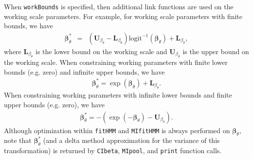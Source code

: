 \documentclass[12pt]{article}\usepackage[]{graphicx}\usepackage[]{color}
\begin{document}
When \verb|workBounds| is specified, then additional link functions are used on the working scale parameters.  For example, for working scale parameters with finite bounds, we have
\begin{eqnarray*}
{\boldsymbol \beta}_\theta^* &=&  \left({\mathbf U}_{\beta_\theta} - {\mathbf L}_{\beta_\theta} \right) \text{logit}^{-1} \left( {\boldsymbol \beta}_\theta \right) + {\mathbf L}_{\beta_\theta},
\end{eqnarray*}
where ${\mathbf L}_{\beta_\theta}$ is the lower bound on the working scale and ${\mathbf U}_{\beta_\theta}$ is the upper bound on the working scale. When constraining working parameters with finite lower bounds (e.g. zero) and infinite upper bounds, we have
\begin{eqnarray*}
{\boldsymbol \beta}_\theta^* =  \exp \left( {\boldsymbol \beta}_\theta \right) + {\mathbf L}_{\beta_\theta}.
\end{eqnarray*}
When constraining working parameters with infinite lower bounds and finite upper bounds (e.g. zero), we have
\begin{eqnarray*}
{\boldsymbol \beta}_\theta^* =  - \left( \exp \left( -{\boldsymbol \beta}_\theta \right) - {\mathbf U}_{\beta_\theta} \right).
\end{eqnarray*}
Although optimization within \verb|fitHMM| and \verb|MIfitHMM| is always performed on ${\boldsymbol \beta}_\theta$, note that ${\boldsymbol \beta}_\theta^*$ (and a delta method approximation for the variance of this transformation) is returned by \verb|CIbeta|, \verb|MIpool|, and \verb|print| function calls.  
\end{document}
